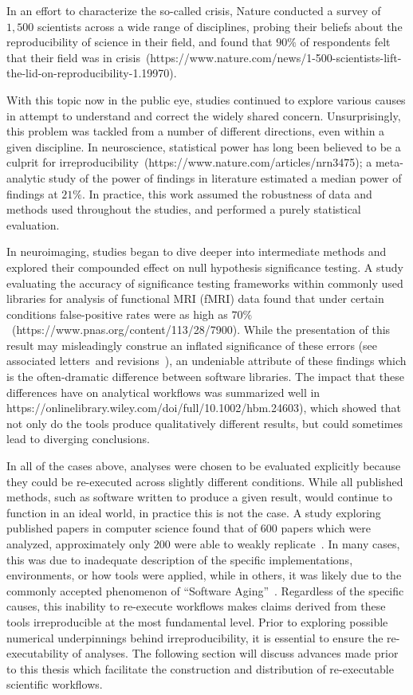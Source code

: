 In an effort to characterize the so-called crisis, Nature conducted a survey of $1,500$ scientists across a wide
range of disciplines, probing their beliefs about the reproducibility of science in their field, and found that $90\%$
of respondents felt that their field was in crisis~\tocite (https://www.nature.com/news/1-500-scientists-lift-the-lid-on-reproducibility-1.19970).

With this topic now in the public eye, studies continued to explore various causes in attempt to understand and correct
the widely shared concern. Unsurprisingly, this problem was tackled from a number of different directions, even within
a given discipline. In neuroscience, statistical power has long been believed to be a culprit for
irreproducibility~\tocite (https://www.nature.com/articles/nrn3475); a meta-analytic study of the power of findings in
literature estimated a median power of findings at $21\%$. In practice, this work assumed the robustness of data and
methods used throughout the studies, and performed a purely statistical evaluation.

In neuroimaging, studies began to dive deeper into intermediate methods and explored their compounded effect on
null hypothesis significance testing. A study evaluating the accuracy of significance testing frameworks within
commonly used libraries for analysis of functional MRI (fMRI) data found that under certain conditions false-positive
rates were as high as $70\%$~\tocite (https://www.pnas.org/content/113/28/7900). While the presentation of this result
may misleadingly construe an inflated significance of these errors (see associated letters~\tocite and
revisions~\tocite), an undeniable attribute of these findings which is the often-dramatic difference between software
libraries. The impact that these differences have on analytical workflows was summarized well in https://onlinelibrary.wiley.com/doi/full/10.1002/hbm.24603),
which showed that not only do the tools produce qualitatively different results, but could sometimes lead to diverging
conclusions.

In all of the cases above, analyses were chosen to be evaluated explicitly because they could be re-executed across
slightly different conditions.  While all published methods, such as software written to produce a given result, would
continue to function in an ideal world, in practice this is not the case. A study exploring published papers in
computer science found that of $600$ papers which were analyzed, approximately only $200$ were able to weakly
replicate~\cite{collberg2016repeatability}. In many cases, this was due to
inadequate description of the specific implementations, environments, or how tools were applied, while in others, it
was likely due to the commonly accepted phenomenon of ``Software Aging''~\cite{parnas1994software}. Regardless of the
specific causes, this inability to re-execute workflows makes claims derived from these tools irreproducible at the
most fundamental level. Prior to exploring possible numerical underpinnings behind irreproducibility, it is essential
to ensure the re-executability of analyses. The following section will discuss advances made prior to this thesis which
facilitate the construction and distribution of re-executable scientific workflows.

